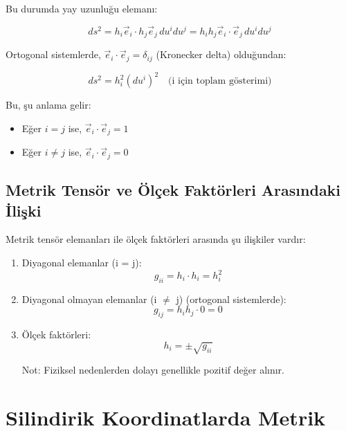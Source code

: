 \documentclass[11pt,letterpaper,twocolumn]{fenbil}
\begin{document}
Bu durumda yay uzunluğu elemanı:

\begin{equation}
ds^2 = h_i \vec{e}_i \cdot h_j \vec{e}_j \, du^i du^j = h_i h_j \vec{e}_i \cdot \vec{e}_j \, du^i du^j
\end{equation}

Ortogonal sistemlerde, $\vec{e}_i \cdot \vec{e}_j = \delta_{ij}$ (Kronecker delta) olduğundan:

\begin{equation}
ds^2 = h_i^2 (du^i)^2 \quad \text{(i için toplam gösterimi)}
\end{equation}

Bu, şu anlama gelir:
\begin{itemize}
\item Eğer $i = j$ ise, $\vec{e}_i \cdot \vec{e}_j = 1$
\item Eğer $i \neq j$ ise, $\vec{e}_i \cdot \vec{e}_j = 0$
\end{itemize}

\subsection{Metrik Tensör ve Ölçek Faktörleri Arasındaki İlişki}

Metrik tensör elemanları ile ölçek faktörleri arasında şu ilişkiler vardır:

\begin{enumerate}
\item Diyagonal elemanlar (i = j):
   \begin{equation}
   g_{ii} = h_i \cdot h_i = h_i^2
   \end{equation}

\item Diyagonal olmayan elemanlar (i $\neq$ j) (ortogonal sistemlerde):
   \begin{equation}
   g_{ij} = h_i h_j \cdot 0 = 0
   \end{equation}

\item Ölçek faktörleri:
   \begin{equation}
   h_i = \pm \sqrt{g_{ii}}
   \end{equation}
   
   Not: Fiziksel nedenlerden dolayı genellikle pozitif değer alınır.
\end{enumerate}

\section{Silindirik Koordinatlarda Metrik}
\end{document}

